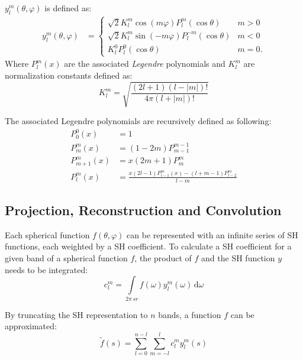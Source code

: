 \documentclass[thesis.tex]{subfiles}
\begin{document}
$y^m_l(\theta, \varphi)$ is defined as:
\begin{equation}
	\begin{alignedat}{2}
		y^m_l(\theta, \varphi) &= \begin{cases}
		\sqrt{2}K^m_l \cos(m\varphi) P^m_l(\cos\theta) & m>0\\
		\sqrt{2}K^m_l \sin(-m\varphi) P^{-m}_l(\cos\theta) & m<0\\
		K^0_l P^0_l(\cos\theta) & m=0.\end{cases}
	\end{alignedat}
\end{equation}
Where $P^m_l(x)$ are the associated \emph{Legendre} polynomials and $K^m_l$ are normalization constants defined as:
\begin{equation}
	K^m_l = \sqrt{\frac{(2l+1)(l-|m|)!}{4\pi(l+|m|)!}}
\end{equation}

The associated Legendre polynomials are recursively defined as following:
\begin{equation}
	\begin{alignedat}{2}
		P^0_0(x) &= 1\\
		P^m_m(x) &= (1-2m)P^{m-1}_{m-1}\\
		P^m_{m+1}(x) &= x(2m+1)P^m_m\\	
		P^m_l(x) &= \frac{x(2l-1)P^m_{l-1}(x)-(l+m-1)P^m_{l-2}}{l-m}
	\end{alignedat}
\end{equation}


\subsection{Projection, Reconstruction and Convolution} \label{sec:preq:shprojectrecon}
Each spherical function $f(\theta, \varphi)$ can be represented with an infinite series of SH functions, each weighted by a SH coefficient.
To calculate a SH coefficient for a given band of a spherical function $f$, the product of $f$ and the SH function $y$ needs to be integrated:
\begin{equation} \label{eq:shprojection}
	c^m_l=\int\limits_{2\pi\,sr} f(\omega)y^m_l(\omega)\, \mathrm{d}\omega
\end{equation}

By truncating the SH representation to $n$ bands, a function $f$ can be approximated:
\begin{equation}
	\widetilde{f}(s) = \sum_{l=0}^{n-l}\sum_{m=-l}^l c_l^m y_l^m(s)
\end{equation}
\end{document}
